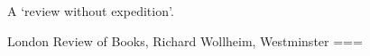 A ‘review without expedition’.

London Review of Books, Richard Wollheim, Westminster
===
\nocite{wollheim1985a}